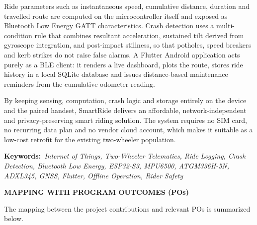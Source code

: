 \documentclass[12pt,a4paper,oneside]{report}
\begin{document}
Ride parameters such as instantaneous speed, cumulative distance, duration and travelled
route are computed on the microcontroller itself and exposed as Bluetooth Low Energy GATT
characteristics. Crash detection uses a multi-condition rule that combines resultant
acceleration, sustained tilt derived from gyroscope integration, and post-impact stillness,
so that potholes, speed breakers and kerb strikes do not raise false alarms. A Flutter
Android application acts purely as a BLE client: it renders a live dashboard, plots the
route, stores ride history in a local SQLite database and issues distance-based maintenance
reminders from the cumulative odometer reading.

By keeping sensing, computation, crash logic and storage entirely on the device and the
paired handset, SmartRide delivers an affordable, network-independent and privacy-preserving
smart riding solution. The system requires no SIM card, no recurring data plan and no
vendor cloud account, which makes it suitable as a low-cost retrofit for the existing
two-wheeler population.

\vspace{1.2em}
\noindent\textbf{Keywords:}~\textit{Internet of Things, Two-Wheeler Telematics, Ride
Logging, Crash Detection, Bluetooth Low Energy, ESP32-S3, MPU6500, ATGM336H-5N, ADXL345,
GNSS, Flutter, Offline Operation, Rider Safety}
\clearpage

\thispagestyle{empty}
\begin{center}{\large\bfseries MAPPING WITH PROGRAM OUTCOMES (POs)\par}\end{center}
\vspace{2.2em}

The mapping between the project contributions and relevant POs is summarized below.
\end{document}
